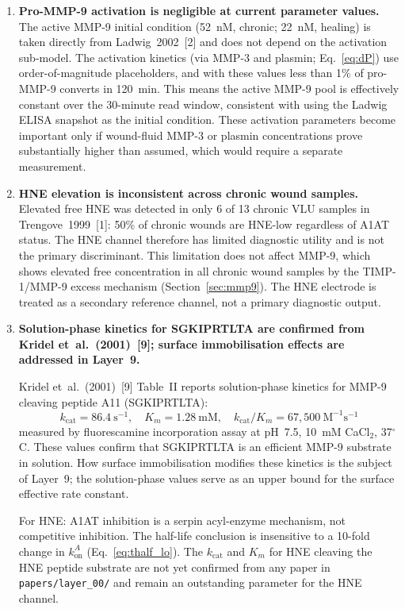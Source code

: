 \documentclass[10pt,a4paper]{article}
\numberwithin{equation}{section}
\newcommand{\kon}{k_{\text{on}}}
\newcommand{\Mms}{\text{M}^{-1}\text{s}^{-1}}
\newcommand{\cit}[1]{[#1]}   %
\begin{document}
\begin{enumerate}[leftmargin=*]
  \item \textbf{Pro-MMP-9 activation is negligible at current parameter values.}
    The active MMP-9 initial condition (52~nM, chronic; 22~nM, healing) is taken
    directly from Ladwig~2002~\cit{2} and does not depend on the activation sub-model.
    The activation kinetics (via MMP-3 and plasmin; Eq.~\ref{eq:dP}) use
    order-of-magnitude placeholders, and with these values less than 1\% of pro-MMP-9
    converts in 120~min. This means the active MMP-9 pool is effectively constant over
    the 30-minute read window, consistent with using the Ladwig ELISA snapshot as the
    initial condition. These activation parameters become important only if wound-fluid
    MMP-3 or plasmin concentrations prove substantially higher than assumed, which would
    require a separate measurement.

  \item \textbf{HNE elevation is inconsistent across chronic wound samples.}
    Elevated free HNE was detected in only 6 of 13 chronic VLU samples in
    Trengove~1999~\cit{1}: 50\% of chronic wounds are HNE-low regardless of A1AT
    status. The HNE channel therefore has limited diagnostic utility and is not the
    primary discriminant. This limitation does not affect MMP-9, which shows elevated
    free concentration in all chronic wound samples by the TIMP-1/MMP-9 excess
    mechanism (Section~\ref{sec:mmp9}). The HNE electrode is treated as a secondary
    reference channel, not a primary diagnostic output.

  \item \textbf{Solution-phase kinetics for SGKIPRTLTA are confirmed from
    Kridel et~al.\ (2001)~\cit{9}; surface immobilisation effects are addressed
    in Layer~9.}

    Kridel et~al.\ (2001)~\cit{9} Table~II reports solution-phase kinetics for MMP-9
    cleaving peptide A11 (SGKIPRTLTA):
    \begin{equation*}
      k_{\text{cat}} = 86.4\ \text{s}^{-1},\quad K_m = 1.28\ \text{mM},\quad
      k_{\text{cat}}/K_m = 67{,}500\ \Mms
    \end{equation*}
    measured by fluorescamine incorporation assay at pH~7.5, 10~mM CaCl$_2$, 37$^\circ$C.
    These values confirm that SGKIPRTLTA is an efficient MMP-9 substrate in solution.
    How surface immobilisation modifies these kinetics is the subject of Layer~9; the
    solution-phase values serve as an upper bound for the surface effective rate constant.

    For HNE: A1AT inhibition is a serpin acyl-enzyme mechanism, not competitive inhibition.
    The half-life conclusion is insensitive to a 10-fold change in $\kon^A$
    (Eq.~\ref{eq:thalf_lo}). The $k_{\text{cat}}$ and $K_m$
    for HNE cleaving the HNE peptide substrate are not yet confirmed from any paper in
    \texttt{papers/layer\_00/} and remain an outstanding parameter for the HNE channel.

\end{enumerate}
\end{document}
